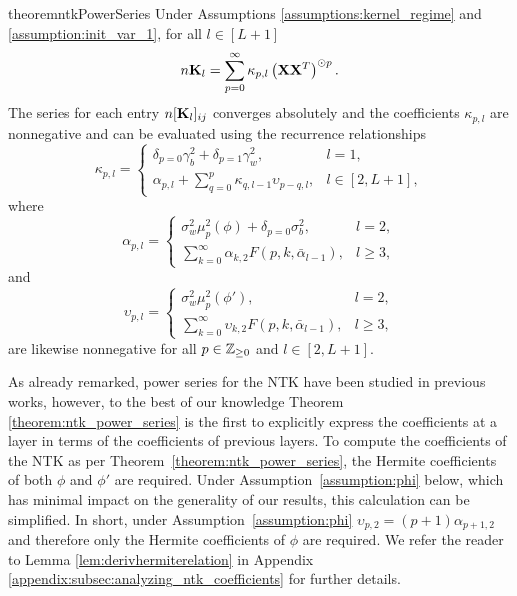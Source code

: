 \begin{restatable}{theorem}{ntkPowerSeries}\label{theorem:ntk_power_series}
    Under Assumptions \ref{assumptions:kernel_regime} and \ref{assumption:init_var_1}, for all $l \in [L+1]$
    \begin{equation}\label{eq:ntk_power_series}
        n\mathbf{K}_{l} = \sum_{p=0}^{\infty} \kappa_{p,l}\left( \mathbf{X} \mathbf{X}^T \right)^{\odot p}.
    \end{equation}
    The series for each entry $n[\mathbf{K}_{l}]_{ij}$ converges absolutely and the coefficients $\kappa_{p,l}$ are nonnegative and can be evaluated using the recurrence relationships
    \begin{equation}\label{eq:recurrence_ntk_coeffs}
        \kappa_{p,l} = 
        \begin{cases}
            \delta_{p=0}\gamma_b^2 + \delta_{p=1}\gamma_w^2, & l=1,\\
            \alpha_{p,l} + \sum_{q = 0}^p \kappa_{q,l-1}\upsilon_{p-q,l}, &l \in [2,L+1],
        \end{cases}
    \end{equation}
    where
    \begin{equation} \label{eq:recurrence_alpha_coeffs}
        \alpha_{p,l} = 
        \begin{cases}
            \sigma_w^2 \mu_p^2(\phi) + \delta_{p=0}\sigma_b^2, &l=2,\\
            \sum_{k=0}^{\infty}\alpha_{k,2} F(p,k,\bar{\alpha}_{l-1}), &l\geq 3, 
        \end{cases}
    \end{equation}
    and
    \begin{equation} \label{eq:recurrence_upsilon_coeffs}
        \upsilon_{p,l} = 
        \begin{cases}
            \sigma_w^2 \mu_p^2(\phi'), &l=2,\\
            \sum_{k=0}^{\infty} \upsilon_{k,2} F(p,k,\bar{\alpha}_{l-1}), &l\geq3, 
        \end{cases}
    \end{equation}
    are likewise nonnegative for all $p \in \mathbb{Z}_{\geq 0}$ and $l \in [2, L+1]$.
\end{restatable}
As already remarked, power series for the NTK have been studied in previous works, however, to the best of our knowledge Theorem \ref{theorem:ntk_power_series} is the first to explicitly express the coefficients at a layer in terms of the coefficients of previous layers. To compute the coefficients of the NTK as per Theorem~\ref{theorem:ntk_power_series}, the Hermite coefficients of both $\phi$ and $\phi'$ are required. Under Assumption~\ref{assumption:phi} below, which has minimal impact on the generality of our results, this calculation can be simplified. In short, under Assumption~\ref{assumption:phi} $\upsilon_{p,2} = (p+1) \alpha_{p+1,2}$ and therefore only the Hermite coefficients of $\phi$ are required. We refer the reader to Lemma \ref{lem:derivhermiterelation} in Appendix \ref{appendix:subsec:analyzing_ntk_coefficients} for further details.

